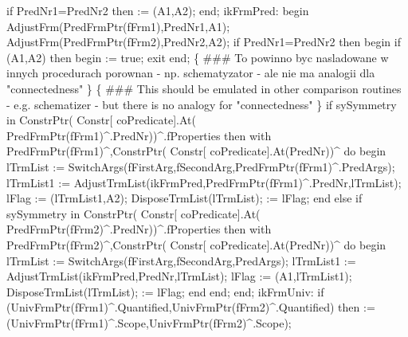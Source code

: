                if PredNr1=PredNr2 then
                   := (A1,A2);
            end;
         ikFrmPred:
            begin
               AdjustFrm(PredFrmPtr(fFrm1),PredNr1,A1);
               AdjustFrm(PredFrmPtr(fFrm2),PredNr2,A2);
               if PredNr1=PredNr2 then
               begin
                  if (A1,A2) then
                  begin  := true;
                  exit
                  end;
                  \{ ### To powinno byc nasladowane w innych procedurach porownan
                    - np. schematyzator - ale nie ma analogii dla "connectedness"
                  \}
                  \{ ### This should be emulated in other comparison routines
                    - e.g. schematizer - but there is no analogy for "connectedness"
                  \}
                  if sySymmetry in ConstrPtr( Constr[ coPredicate].At(
                                                 PredFrmPtr(fFrm1)^.PredNr))^.fProperties then
                     with PredFrmPtr(fFrm1)^,ConstrPtr( Constr[ coPredicate].At(PredNr))^ do
                  begin
                     lTrmList := SwitchArgs(fFirstArg,fSecondArg,PredFrmPtr(fFrm1)^.PredArgs);
                     lTrmList1 := AdjustTrmList(ikFrmPred,PredFrmPtr(fFrm1)^.PredNr,lTrmList);
                     lFlag := (lTrmList1,A2);
                     DisposeTrmList(lTrmList);
                      := lFlag;
                  end
                  else if sySymmetry in ConstrPtr( Constr[ coPredicate].At(
                                                      PredFrmPtr(fFrm2)^.PredNr))^.fProperties then
                     with PredFrmPtr(fFrm2)^,ConstrPtr( Constr[ coPredicate].At(PredNr))^ do
                  begin
                     lTrmList := SwitchArgs(fFirstArg,fSecondArg,PredArgs);
                     lTrmList1 := AdjustTrmList(ikFrmPred,PredNr,lTrmList);
                     lFlag := (A1,lTrmList1);
                     DisposeTrmList(lTrmList);
                      := lFlag;
                  end
               end;
            end;
         ikFrmUniv:
            if (UnivFrmPtr(fFrm1)^.Quantified,UnivFrmPtr(fFrm2)^.Quantified) then
                := (UnivFrmPtr(fFrm1)^.Scope,UnivFrmPtr(fFrm2)^.Scope);
